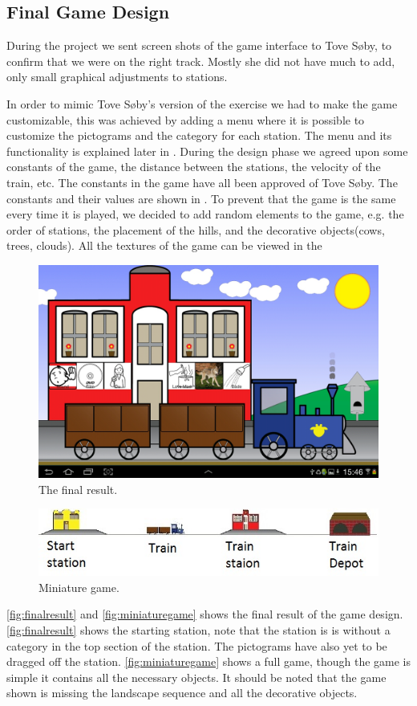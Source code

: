 \subsection{Final Game Design}\label{sec:designgameinterface}

During the project we sent screen shots of the game interface to Tove Søby, to confirm that we were on the right track. Mostly she did not have much to add, only small graphical adjustments to stations.

In order to mimic Tove Søby's version of the exercise we had to make the game customizable, this was achieved by adding a menu where it is possible to customize the pictograms and the category for each station. The menu and its functionality is explained later in .
During the design phase we agreed upon some constants of the game, the distance between the stations, the velocity of the train, etc. The constants in the game have all been approved of Tove Søby. The constants and their values are shown in .
To prevent that the game is the same every time it is played, we decided to add random elements to the game, e.g. the order of stations, the placement of the hills, and the decorative objects(cows, trees, clouds). 
All the textures of the game can be viewed in the 
\begin{figure}[H]
\centering
\includegraphics[width=0.9\linewidth]{img/screenshots/gamedesign1.jpg}
\caption{The final result.}
\label{fig:finalresult}
\end{figure}
\begin{figure}[H]
\centering
\includegraphics[width=0.9\linewidth]{img/screenshots/stations.jpg}
\caption{Miniature game.}
\label{fig:miniaturegame}
\end{figure}
\autoref{fig:finalresult} and \autoref{fig:miniaturegame} shows the final result of the game design. \autoref{fig:finalresult} shows the starting station, note that the station is is without a category in the top section of the station. The pictograms have also yet to be dragged off the station.
\autoref{fig:miniaturegame} shows a full game, though the game is simple it contains all the necessary objects. It should be noted that the game shown is missing the landscape sequence and all the decorative objects.

